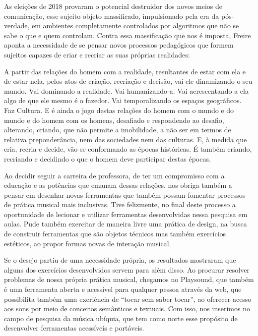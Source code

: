 As eleições de 2018 provaram o potencial destruidor dos novos meios de comunicação, esse sujeito objeto massificado, impulsionado pela era da pós-verdade, em ambientes completamente controlados por algoritmos que não se sabe o que e quem controlam. Contra essa massificação que nos é imposta, Freire \citeyear{Freire2015} aponta a necessidade de se pensar novos processos pedagógicos que formem sujeitos capazes de criar e recriar as suas próprias realidades:

\begin{citacao}
A partir das relações do homem com a realidade, resultantes de estar com ela e de estar nela, pelos atos de criação, recriação e decisão, vai ele dinamizando o seu mundo. Vai dominando a realidade. Vai humanizando-a. Vai acrescentando a ela algo de que ele mesmo é o fazedor. Vai temporalizando os espaços geográficos. Faz Cultura. E é ainda o jogo destas relações do homem com o mundo e do mundo e do homem com os homens, desafiado e respondendo ao desafio, alterando, criando, que não permite a imobilidade, a não ser em termos de relativa preponderância, nem das sociedades nem das culturas. E, à medida que cria, recria e decide, vão se conformando as épocas históricas. É também criando, recriando e decidindo o que o homem deve participar destas épocas. \cite[60]{Freire2015}
\end{citacao} 




Ao decidir seguir a carreira de professora, de ter um compromisso com a educação e as potências que emanam dessas relações, nos obriga também a pensar em desenhar novas ferramentas que também possam fomentar processos de prática musical mais inclusivas. Tive felizmente, no final deste processo a oportunidade de lecionar e utilizar ferramentas desenvolvidas nessa pesquisa em aulas. Pude também exercitar de maneira livre uma prática de design, na busca de construir ferramentas que são objetos técnicos mas também exercícios estéticos, ao propor formas novas de interação musical. 



Se o desejo partiu de uma necessidade própria, os resultados mostraram que alguns dos exercícios desenvolvidos servem para além disso. Ao procurar resolver problemas de nossa própria prática musical, chegamos no Playsound, que também é uma ferramenta aberta e acessível para qualquer pessoa através da web, que possibilita também uma exeriência de ``tocar sem saber tocar'', ao oferecer acesso aos sons por meio de conceitos semânticos e textuais. Com isso, nos inserimos no campo de pesquisa da música ubíquia, que tem como norte esse propósito de desenvolver ferramentas acessíveis e portáveis. 















